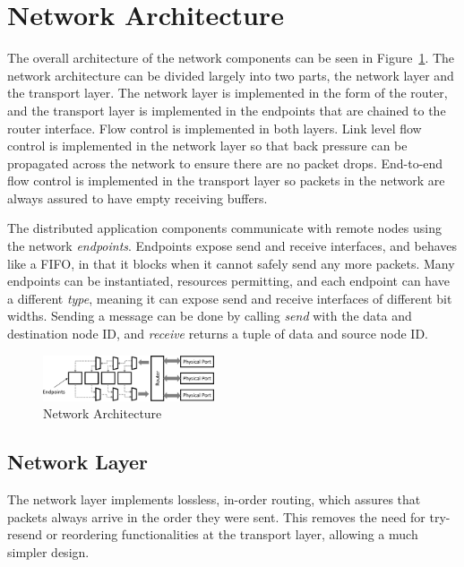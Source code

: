 \section{Network Architecture}
\label{sec:architecture}

The overall architecture of the network components can be seen in
Figure~\ref{fig:network}. 
The network architecture can be divided largely into two parts, the network
layer and the transport layer. The network layer is implemented in the form of
the router, and the transport layer is implemented in the endpoints that are
chained to the router interface. Flow control is implemented in both layers.
Link level flow control is implemented in the network layer so that back
pressure can be propagated across the network to ensure there are no packet
drops. End-to-end flow control is implemented in the transport layer so packets
in the network are always assured to have empty receiving buffers.

The distributed application components communicate with remote nodes using the
network \textit{endpoints}. Endpoints expose send and receive interfaces, and
behaves like a FIFO, in that it blocks when it cannot safely send any more packets.
Many endpoints can be instantiated, resources permitting, and each
endpoint can have a different \textit{type}, meaning it can expose send and
receive interfaces of different bit widths. Sending a message can be done by
calling \textit{send} with the data and destination node ID, and \textit{receive}
returns a tuple of data and source node ID.


\begin{figure}[h]
	\begin{center}
	\includegraphics[width=0.45\textwidth]{resources/routing-crop.pdf}
	\caption{Network Architecture}
	\label{fig:network}
	\end{center}
\end{figure}


\subsection{Network Layer}
\label{sec:networklayer}

The network layer implements lossless, in-order routing, which assures that
packets always arrive in the order they were sent. This removes the need for
try-resend or reordering functionalities at the transport layer, allowing a much
simpler design.

